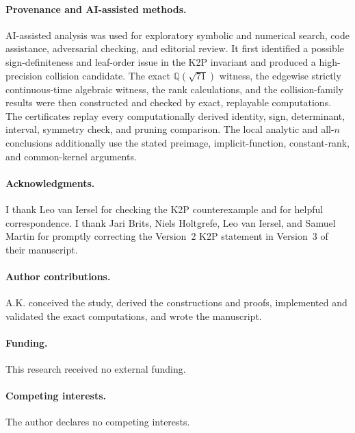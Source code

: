 \documentclass[11pt]{article}
\theoremstyle{remark}\newtheorem{remark}[theorem]{Remark}
\begin{document}
\paragraph{Provenance and AI-assisted methods.}
AI-assisted analysis was used for exploratory symbolic and numerical search, code assistance, adversarial checking, and editorial review. It first identified a possible sign-definiteness and leaf-order issue in the K2P invariant and produced a high-precision collision candidate. The exact $\mathbb Q(\sqrt{71})$ witness, the edgewise strictly continuous-time algebraic witness, the rank calculations, and the collision-family results were then constructed and checked by exact, replayable computations. The certificates replay every computationally derived identity, sign, determinant, interval, symmetry check, and pruning comparison. The local analytic and all-$n$ conclusions additionally use the stated preimage, implicit-function, constant-rank, and common-kernel arguments.

\paragraph{Acknowledgments.}
I thank Leo van Iersel for checking the K2P counterexample and for helpful correspondence. I thank Jari Brits, Niels Holtgrefe, Leo van Iersel, and Samuel Martin for promptly correcting the Version~2 K2P statement in Version~3 of their manuscript.

\paragraph{Author contributions.}
A.K. conceived the study, derived the constructions and proofs, implemented and validated the exact computations, and wrote the manuscript.

\paragraph{Funding.}
This research received no external funding.

\paragraph{Competing interests.}
The author declares no competing interests.
\end{document}
